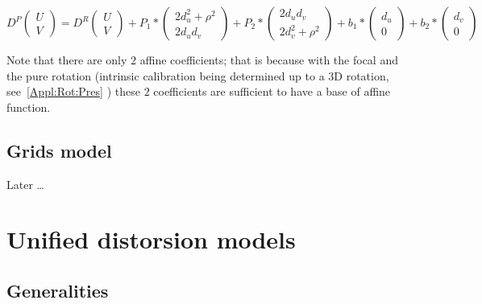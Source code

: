 \begin{equation}
   D^P\begin{pmatrix} U \\ V \end{pmatrix}
      =      D^R\begin{pmatrix} U \\ V \end{pmatrix}
          +  P_1 * \begin{pmatrix} 2d_u^2 + \rho^2 \\  2 d_u d_v \end{pmatrix}
          +  P_2 * \begin{pmatrix}   2 d_u d_v \\ 2d_v^2 + \rho^2 \end{pmatrix}
          + b_1  * \begin{pmatrix}   d_u  \\ 0  \end{pmatrix}
          + b_2  * \begin{pmatrix}   d_v  \\ 0  \end{pmatrix}
\end{equation}

Note that there are only $2$ affine coefficients; that is because with
the focal and the pure rotation (intrinsic calibration being determined up to
a 3D rotation, see~\ref{Appl:Rot:Pres} ) these $2$ coefficients are sufficient to have a
base of affine function.



\subsection{Grids model}

Later \dots




\section{Unified distorsion models}


\subsection{Generalities}

